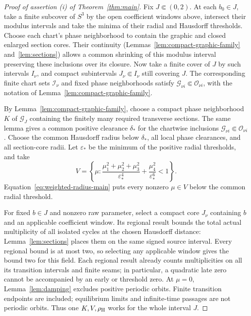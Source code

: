 \begin{proof}[Proof of assertion (i) of Theorem~\ref{thm:main}]
Fix $J\Subset(0,2)$. At each $b_0\in J$, take a finite subcover of
$S^3$ by the open coefficient windows above, intersect their modulus
intervals and take the minima of their radial and Hausdorff thresholds.
Choose each chart's phase neighborhood to contain the graphic and
closed enlarged section cores. Their continuity
(Lemmas~\ref{lem:compact-graphic-family} and~\ref{lem:sections})
allows a common shrinking of this modulus interval preserving these
inclusions over its closure. Now take a finite cover of $J$ by such
intervals $I_\nu$, and compact subintervals $J_\nu\Subset I_\nu$
still covering $J$. The corresponding finite chart sets
$\mathcal I_\nu$ and fixed phase neighborhoods satisfy
$\mathcal G_{\nu i}\Subset\mathcal O_{\nu i}$, with the notation of
Lemma~\ref{lem:compact-graphic-family}.

By Lemma~\ref{lem:compact-graphic-family}, choose a compact phase
neighborhood $K$ of $\mathcal G_J$ containing the finitely many required
transverse sections. The same lemma gives a common positive clearance
$\delta_*$ for the chartwise inclusions
$\mathcal G_{\nu i}\Subset\mathcal O_{\nu i}$. Choose the common
Hausdorff radius below $\delta_*$, all local phase clearances, and all
section-core radii. Let $\varepsilon_*$ be the minimum of the positive
radial thresholds, and take
\begin{equation}\label{eq:raw-neighborhood-main}
 V=\left\{\mu:
 \frac{\mu_1^2+\mu_2^2+\mu_3^2}{\varepsilon_*^4}
 +\frac{\mu_4^2}{\varepsilon_*^6}<1\right\}.
\end{equation}
Equation~\eqref{eq:weighted-radius-main} puts every nonzero $\mu\in V$ below
the common radial threshold.

For fixed $b\in J$ and nonzero raw parameter, select a compact core
$J_\nu$ containing $b$ and an applicable coefficient window. Its regional
result bounds the total actual multiplicity of all isolated cycles at the
chosen Hausdorff distance: Lemma~\ref{lem:sections} places them on the
same signed source interval. Every regional bound is at most two, so
selecting any applicable window gives the bound two for this field.
Each regional result already counts multiplicities on all its
transition intervals and finite seams;
in particular, a quadratic late zero cannot be accompanied by an early
or threshold zero. At $\mu=0$, Lemma~\ref{lem:damping} excludes positive
periodic orbits. Finite transition endpoints are included; equilibrium
limits and infinite-time passages are not periodic orbits. Thus one
$K,V,\rho_{\rm H}$ works for the whole interval $J$.
\end{proof}
